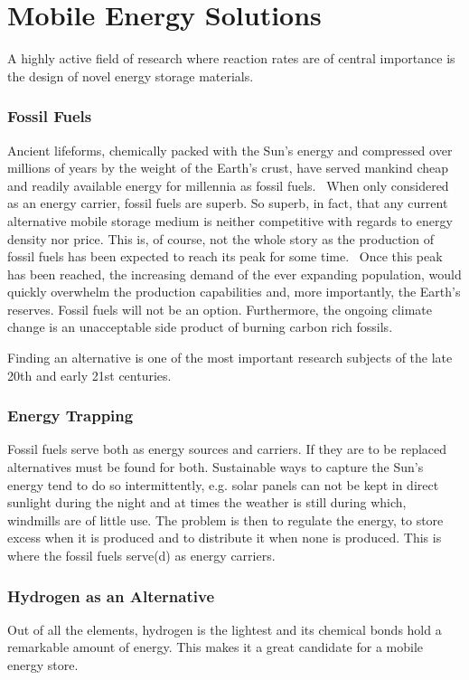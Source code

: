 \section{Mobile Energy Solutions}
A highly active field of research where reaction rates are of central importance is the design of novel energy storage materials.

\subsubsection{Fossil Fuels}
Ancient lifeforms, chemically packed with the Sun's energy and compressed over millions of years by the weight of the Earth's crust, have served mankind cheap and readily available energy for millennia as fossil fuels.~\cite{early-oil-use}
When only considered as an energy carrier, fossil fuels are superb.
So superb, in fact, that any current alternative mobile storage medium is neither competitive with regards to energy density nor price. 
This is, of course, not the whole story as the production of fossil fuels has been expected to reach its peak for some time.~\cite{peak-oil-1956}
Once this peak has been reached, the increasing demand of the ever expanding population, would quickly overwhelm the production capabilities and, more importantly, the Earth's reserves.
Fossil fuels will not be an option.
Furthermore, the ongoing climate change is an unacceptable side product of burning carbon rich fossils.~\cite{climate-change-2007}

Finding an alternative is one of the most important research subjects of the late 20th and early 21st centuries.

\subsubsection{Energy Trapping}
Fossil fuels serve both as energy sources and carriers.
If they are to be replaced alternatives must be found for both.
Sustainable ways to capture the Sun's energy tend to do so intermittently, e.g. solar panels can not be kept in direct sunlight during the night and at times the weather is still during which, windmills are of little use.
The problem is then to regulate the energy, to store excess when it is produced and to distribute it when none is produced.
This is where the fossil fuels serve(d) as energy carriers.

\subsubsection{Hydrogen as an Alternative}
Out of all the elements, hydrogen is the lightest and its chemical bonds hold a remarkable amount of energy.
This makes it a great candidate for a mobile energy store.

